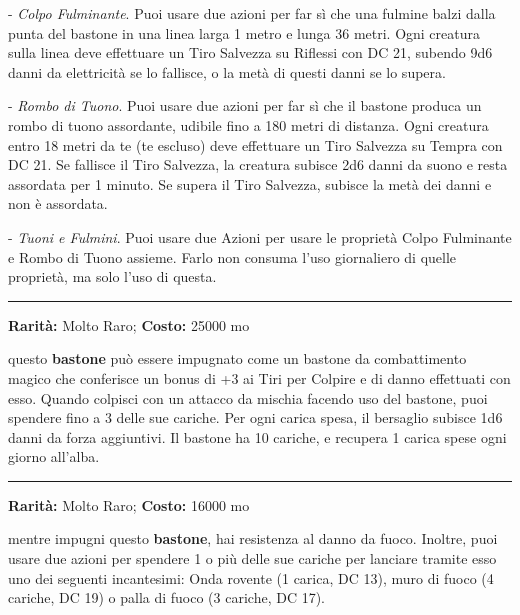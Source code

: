 \begin{multicols}{2}
- \emph{Colpo Fulminante}. Puoi usare due azioni per far sì che una fulmine balzi dalla punta del bastone in una linea larga 1 metro e lunga 36 metri. Ogni creatura sulla linea deve effettuare un Tiro Salvezza su Riflessi con DC 21, subendo 9d6 danni da elettricità se lo fallisce, o la metà di questi danni se lo supera.

- \emph{Rombo di Tuono}. Puoi usare due azioni per far sì che il bastone produca un rombo di tuono assordante, udibile fino a 180 metri di distanza. Ogni creatura entro 18 metri da te (te escluso) deve effettuare un Tiro Salvezza su Tempra con DC 21. Se fallisce il Tiro Salvezza, la creatura subisce 2d6 danni da suono e resta assordata per 1 minuto. Se supera il Tiro Salvezza, subisce la metà dei danni e non è assordata.

- \emph{Tuoni e Fulmini}. Puoi usare due Azioni per usare le proprietà Colpo Fulminante e Rombo di Tuono assieme. Farlo non consuma l'uso giornaliero di quelle proprietà, ma solo l'uso di questa.

\smallskip\noindent\rule{\linewidth}{2pt}  \hypertarget{BastonedelColpire}{}\smallskip{}\noindent\label{BastonedelColpire}

\textbf{Rarità:} Molto Raro; \textbf{Costo:} 25000 mo

questo \textbf{bastone} può essere impugnato come un bastone da combattimento magico che conferisce un bonus di +3 ai Tiri per Colpire e di danno effettuati con esso. Quando colpisci con un attacco da mischia facendo uso del bastone, puoi spendere fino a 3 delle sue cariche. Per ogni carica spesa, il bersaglio subisce 1d6 danni da forza aggiuntivi. Il bastone ha 10 cariche, e recupera 1 carica spese ogni giorno all'alba.

\smallskip\noindent\rule{\linewidth}{2pt}  \hypertarget{BastonedelFuoco}{}\smallskip{}\noindent\label{BastonedelFuoco}

\textbf{Rarità:} Molto Raro; \textbf{Costo:} 16000 mo

mentre impugni questo \textbf{bastone}, hai resistenza al danno da fuoco.
Inoltre, puoi usare due azioni per spendere 1 o più delle sue cariche per lanciare tramite esso uno dei seguenti incantesimi: Onda rovente (1 carica, DC 13), muro di fuoco (4 cariche, DC 19) o palla di fuoco (3 cariche, DC 17).


\end{multicols}
